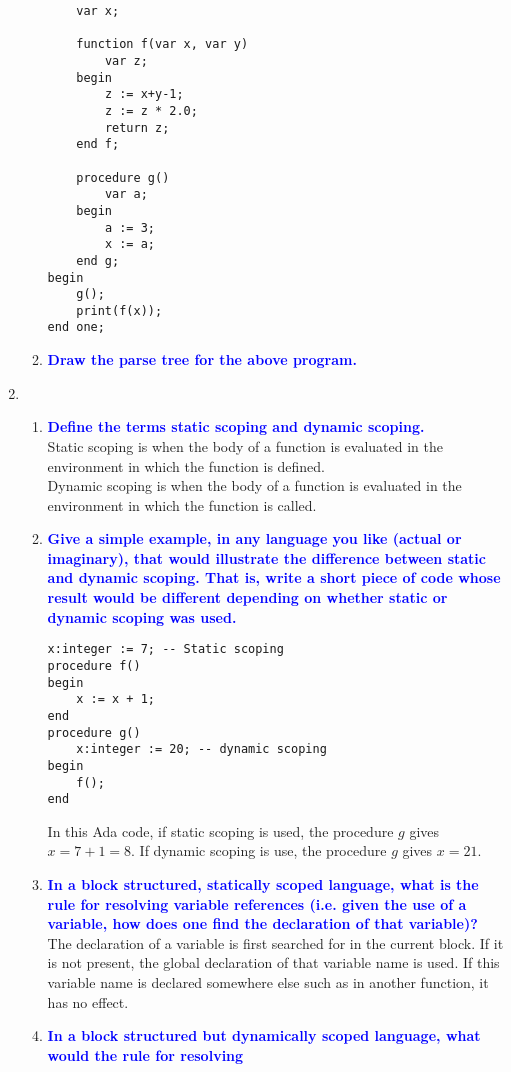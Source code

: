 \documentclass[11pt]{article}
\begin{document}
\begin{enumerate}
\begin{enumerate}
\begin{verbatim}
    var x;
    
    function f(var x, var y)
        var z;
    begin
        z := x+y-1;
        z := z * 2.0;
        return z;
    end f;

    procedure g()
        var a;
    begin
        a := 3;
        x := a;
    end g;
begin
    g();
    print(f(x));
end one;
    \end{verbatim}
    \item \textbf{\textcolor{blue}{Draw the parse tree for the above program.}}
    \end{enumerate}
\item 
    \begin{enumerate}
    \item \textbf{\textcolor{blue}{Define the terms static scoping and dynamic scoping.}}
        \\ Static scoping is when the body of a function is evaluated in the environment in which the function is defined.
        \\ Dynamic scoping is when the body of a function is evaluated in the environment in which the function is called.
    \item \textbf{\textcolor{blue}{Give a simple example, in any language you like (actual or imaginary), that would illustrate the difference between static and dynamic scoping. That is, write a short piece of code whose result would be different depending on whether static or dynamic scoping was used.}}
        \begin{verbatim}
x:integer := 7; -- Static scoping
procedure f()
begin
    x := x + 1;
end
procedure g()
    x:integer := 20; -- dynamic scoping
begin
    f();
end
        \end{verbatim}
        In this Ada code, if static scoping is used, the procedure $g$ gives $x=7+1=8$.
        If dynamic scoping is use, the procedure $g$ gives $x=21$.
    \item  \textbf{\textcolor{blue}{In a block structured, statically scoped language, what is the rule for resolving variable references (i.e. given the use of a variable, how does one find the declaration of that variable)?}}
        \\ The declaration of a variable is first searched for in the current block. If it is not present, the global declaration of that variable name is used. If this variable name is declared somewhere else such as in another function, it has no effect.
    \item  \textbf{\textcolor{blue}{In a block structured but dynamically scoped language, what would the rule for resolving
}}
\end{enumerate}
\end{enumerate}
\end{document}
